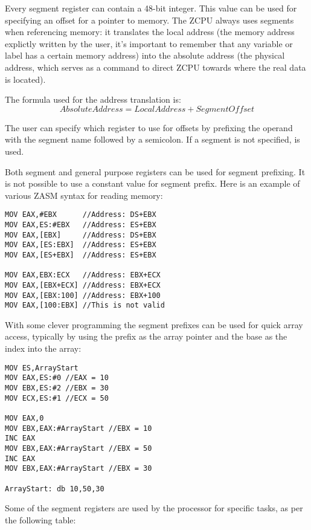 Every segment register can contain a 48-bit integer. This value can be used for specifying an offset for a pointer to memory. The ZCPU always uses segments when referencing memory: it translates the local address (the memory address explictly written by the user, it's important to remember that any variable or label has a certain memory address) into the absolute address (the physical address, which serves as a command to direct ZCPU towards where the real data is located).

The formula used for the address translation is:
\[AbsoluteAddress = LocalAddress + SegmentOffset\]

The user can specify which register to use for offsets by prefixing the operand with the segment name followed by a semicolon. If a segment is not specified,  is used.

Both segment and general purpose registers can be used for segment prefixing. It is not possible to use a constant value for segment prefix. Here is an example of various ZASM syntax for reading memory:
\begin{verbatim}
MOV EAX,#EBX      //Address: DS+EBX
MOV EAX,ES:#EBX   //Address: ES+EBX
MOV EAX,[EBX]     //Address: DS+EBX
MOV EAX,[ES:EBX]  //Address: ES+EBX
MOV EAX,[ES+EBX]  //Address: ES+EBX

MOV EAX,EBX:ECX   //Address: EBX+ECX
MOV EAX,[EBX+ECX] //Address: EBX+ECX
MOV EAX,[EBX:100] //Address: EBX+100
MOV EAX,[100:EBX] //This is not valid
\end{verbatim}

With some clever programming the segment prefixes can be used for quick array access, typically by using the prefix as the array pointer and the base as the index into the array:
\begin{verbatim}
MOV ES,ArrayStart
MOV EAX,ES:#0 //EAX = 10
MOV EBX,ES:#2 //EBX = 30
MOV ECX,ES:#1 //ECX = 50

MOV EAX,0
MOV EBX,EAX:#ArrayStart //EBX = 10
INC EAX
MOV EBX,EAX:#ArrayStart //EBX = 50
INC EAX
MOV EBX,EAX:#ArrayStart //EBX = 30

ArrayStart: db 10,50,30
\end{verbatim}

Some of the segment registers are used by the processor for specific tasks, as per the following table:

